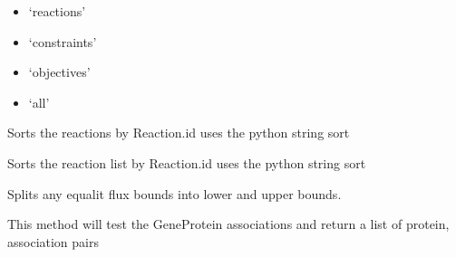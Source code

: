 \documentclass[a4paper,11pt,english]{sphinxmanual}
\begin{document}
\begin{fulllineitems}
\begin{fulllineitems}
\begin{itemize}
\item {} 
`reactions'

\item {} 
`constraints'

\item {} 
`objectives'

\item {} 
`all'

\end{itemize}

\end{fulllineitems}


\begin{fulllineitems}
\label{modules_doc:cbmpy.CBModel.Model.sortReactionsById}
Sorts the reactions by Reaction.id uses the python string sort

\end{fulllineitems}


\begin{fulllineitems}
\label{modules_doc:cbmpy.CBModel.Model.sortSpeciesById}
Sorts the reaction list by Reaction.id uses the python string sort

\end{fulllineitems}


\begin{fulllineitems}
\label{modules_doc:cbmpy.CBModel.Model.splitEqualityFluxBounds}
Splits any equalit flux bounds into lower and upper bounds.

\end{fulllineitems}


\begin{fulllineitems}
\label{modules_doc:cbmpy.CBModel.Model.testGeneProteinAssociations}
This method will test the GeneProtein associations and return a list of protein, association pairs

\end{fulllineitems}


\end{fulllineitems}
\end{document}
